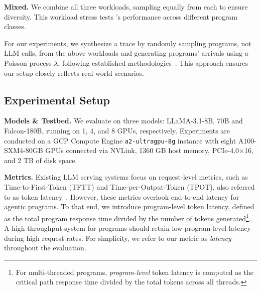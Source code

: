 \vspace{1mm}
\noindent \textbf{Mixed.} We combine all three workloads, sampling equally from each to ensure diversity. This workload stress tests \text{\name}'s performance across different program classes.

\vspace{1mm}
\noindent For our experiments, we synthesize a trace by randomly sampling programs, not LLM calls, from the above workloads and generating programs' arrivals using a Poisson process $\lambda$, following established methodologies~\cite{vllm, fastserve}. This approach ensures our setup closely reflects real-world scenarios.

\subsection{Experimental Setup}

\noindent \textbf{Models \& Testbed.} We evaluate on three models: LLaMA-3.1-8B, 70B and Falcon-180B, running on 1, 4, and 8 GPUs, respectively. Experiments are conducted on a GCP Compute Engine \texttt{a2-ultragpu-8g} instance with eight A100-SXM4-80GB GPUs connected via NVLink, 1360 GB host memory, PCIe-4.0×16, and 2 TB of disk space.

\vspace{1mm}
\noindent \textbf{Metrics.} Existing LLM serving systems focus on request-level metrics, such as Time-to-First-Token (TFTT) and Time-per-Output-Token (TPOT), also referred to as token latency~\cite{vllm, fastserve, nanoflow}. However, these metrics overlook end-to-end latency for agentic programs. To that end, we introduce program-level token latency, defined as the total program response time divided by the number of tokens generated\footnote{For multi-threaded programs, \textit{program-level} token latency is computed as the critical path response time divided by the total tokens across all threads.}. A high-throughput system for programs should retain low program-level latency during high request rates. For simplicity, we refer to our metric as \textit{latency} throughout the evaluation.

